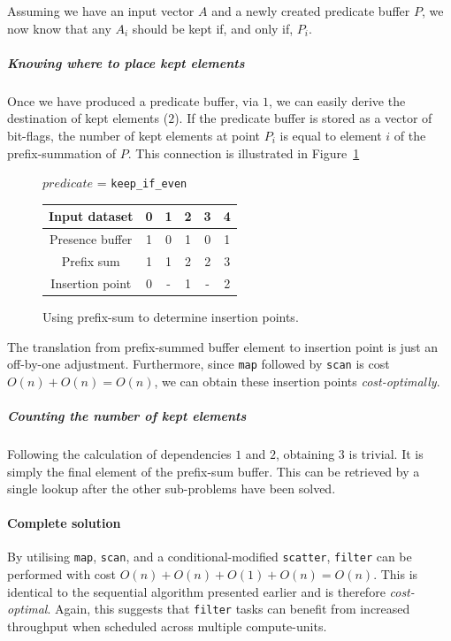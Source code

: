 Assuming we have an input vector $A$ and a newly created predicate buffer $P$, we now know that any $A_i$ should be kept if, and only if, $P_i$.

\subparagraph*{Knowing where to place kept elements}
Once we have produced a predicate buffer, via $1$, we can easily derive the destination of kept elements ($2$). If the predicate buffer is stored as a vector of bit-flags, the number of kept elements at point $P_i$ is equal to element $i$ of the prefix-summation of $P$. This connection is illustrated in Figure~\ref{fig:wheretoplace}

\begin{figure}[h]
\begin{center}
  \caption{Using prefix-sum to determine insertion points.}
  \label{fig:wheretoplace}

  $predicate$ = \verb|keep_if_even|
  \vskip 10pt
  \begin{tabular}{ | c | c | c | c | c | c |}
    \hline
    Input dataset   & 0 & 1 & 2 & 3 & 4 \\ \hline
    Presence buffer & 1 & 0 & 1 & 0 & 1 \\ \hline
    Prefix sum      & 1 & 1 & 2 & 2 & 3 \\ \hline
    Insertion point & 0 & - & 1 & - & 2 \\ \hline
  \end{tabular}
\end{center}
\end{figure}

The translation from prefix-summed buffer element to insertion point is just an off-by-one adjustment.
Furthermore, since \verb|map| followed by \verb|scan| is cost $O(n) + O(n) = O(n)$, we can obtain these insertion points \emph{cost-optimally}.

\subparagraph*{Counting the number of kept elements}
Following the calculation of dependencies $1$ and $2$, obtaining $3$ is trivial. It is simply the final element of the prefix-sum buffer. This can be retrieved by a single lookup after the other sub-problems have been solved.

\paragraph*{Complete solution}
By utilising \verb|map|, \verb|scan|, and a conditional-modified \verb|scatter|, \verb|filter| can be performed with cost $O(n) + O(n) + O(1) + O(n) = O(n)$. This is identical to the sequential algorithm presented earlier and is therefore \emph{cost-optimal}. Again, this suggests that \verb|filter| tasks can benefit from increased throughput when scheduled across multiple compute-units.


